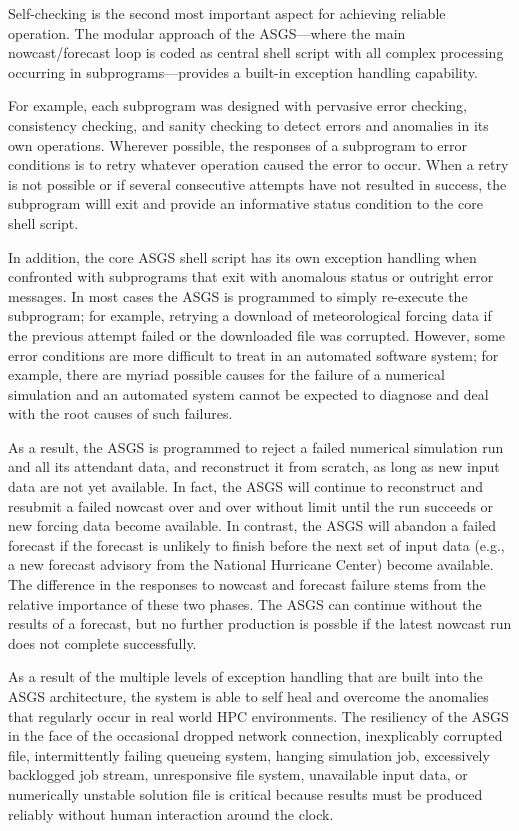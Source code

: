\documentclass[jmse,article,submit,moreauthors,pdftex,12pt,a4paper]{mdpi}
\begin{document}
Self-checking is the second most important aspect for achieving 
reliable operation. The modular approach of the ASGS---where the 
main nowcast/forecast loop is coded as central shell script with all 
complex processing occurring in subprograms---provides a built-in
exception handling capability. 

For example, each subprogram was designed with pervasive error 
checking, consistency checking, and sanity checking to detect errors 
and anomalies in its own operations. Wherever possible, the 
responses of a subprogram to error conditions is to retry whatever 
operation caused the error to occur. When a retry is not possible or 
if several consecutive attempts have not resulted in success, the 
subprogram willl exit and provide an informative status condition to 
the core shell script. 

In addition, the core ASGS shell script has its own exception 
handling when confronted with subprograms that exit with anomalous 
status or outright error messages. In most cases the ASGS is 
programmed to simply re-execute the subprogram; for example, 
retrying a download of meteorological forcing data if the previous 
attempt failed or the downloaded file was corrupted. However, some 
error conditions are more difficult to treat in an automated 
software system; for example, there are myriad possible causes for 
the failure of a numerical simulation and an automated system cannot 
be expected to diagnose and deal with the root causes of such 
failures. 

As a result, the ASGS is programmed to reject a failed numerical 
simulation run and all its attendant data, and reconstruct it from 
scratch, as long as new input data are not yet available. In fact, 
the ASGS will continue to reconstruct and resubmit a failed nowcast 
over and over without limit until the run succeeds or new forcing 
data become available. In contrast, the ASGS will abandon a failed 
forecast if the forecast is unlikely to finish before the next set 
of input data (e.g., a new forecast advisory from the National 
Hurricane Center) become available. The difference in the responses 
to nowcast and forecast failure stems from the relative 
importance of these two phases. The ASGS can continue without the 
results of a forecast, but no further production is possble if the 
latest nowcast run does not complete successfully. 

As a result of the multiple levels of exception handling that are 
built into the ASGS architecture, the system is able to self heal 
and overcome the anomalies that regularly occur in real world HPC 
environments. The resiliency of the ASGS in the face of the 
occasional dropped network connection, inexplicably corrupted file, 
intermittently failing queueing system, hanging simulation job, 
excessively backlogged job stream, unresponsive file system, 
unavailable input data, or numerically unstable solution file is 
critical because results must be produced reliably without human 
interaction around the clock. 
\end{document}
